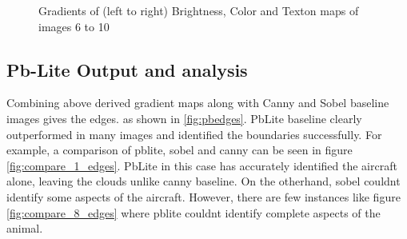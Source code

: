\documentclass[conference]{IEEEtran}
\begin{document}
\begin{figure}
			
			
			\caption{Gradients of (left to right) Brightness, Color and Texton maps of images 6 to 10}
			\label{fig:gradient maps 6 to 10}
		\end{figure}
		\subsection{Pb-Lite Output and analysis}
		Combining above derived gradient maps along with Canny and Sobel baseline images gives the edges.  as shown in \ref{fig:pbedges}.
		PbLite baseline clearly outperformed in many images and identified the boundaries successfully. For example, a comparison of pblite, sobel and canny can be seen in figure \ref{fig:compare_1_edges}. PbLite in this case has accurately identified the aircraft alone, leaving the clouds unlike canny baseline. On the otherhand, sobel couldnt identify some aspects of the aircraft. However, there are few instances like figure \ref{fig:compare_8_edges} where pblite couldnt identify complete aspects of the animal.
		
\end{document}
